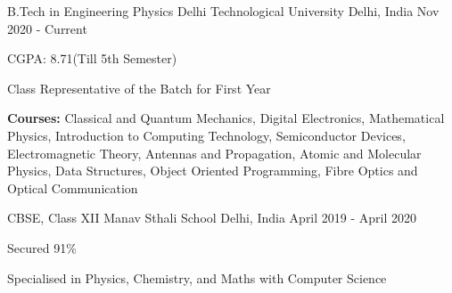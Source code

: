 

\begin{cventries}

  \cventry
    {B.Tech in Engineering Physics} %
    {Delhi Technological University} %
    {Delhi, India} %
    {Nov 2020 - Current} %
    {
      \begin{cvitems} %
        \item {CGPA: 8.71(Till 5th Semester)}
        \item {Class Representative of the Batch for First Year}
        \item {\textbf{Courses:} Classical and Quantum Mechanics, Digital Electronics, Mathematical Physics, Introduction to Computing Technology, Semiconductor Devices, Electromagnetic Theory, Antennas and Propagation, Atomic and Molecular Physics, Data Structures, Object Oriented Programming, Fibre Optics and Optical Communication}
      \end{cvitems}
    }
    
  \cventry
    {CBSE, Class XII} %
    {Manav Sthali School} %
    {Delhi, India} %
    {April 2019 - April 2020} %
    {
      \begin{cvitems} %
        \item {Secured 91\%}
        \item {Specialised in Physics, Chemistry, and Maths with Computer Science}
      \end{cvitems}
    }
 
\end{cventries}
